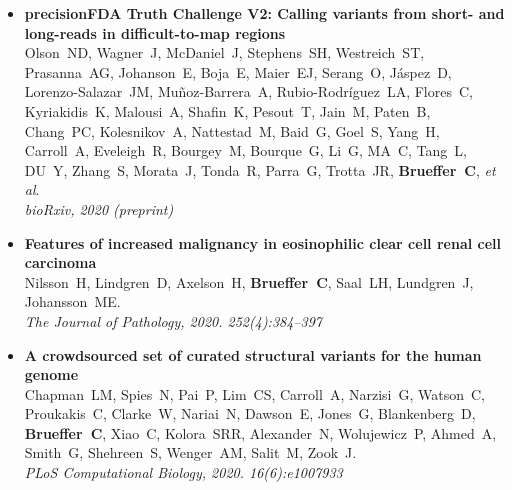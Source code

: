 \documentclass[11pt]{book}
\begin{document}
{\begin{tabularx}{\textwidth}{rX}
\end{tabularx}


}




\vspace{5mm}

\begin{itemize}[labelsep=5.3mm]

  \item \textbf{precisionFDA Truth Challenge V2: Calling variants from short- and long-reads in difficult-to-map regions} \\[1mm]
  Olson~ND, Wagner~J, McDaniel~J, Stephens~SH, Westreich~ST, Prasanna~AG, Johanson~E, Boja~E, Maier~EJ, Serang~O, Jáspez~D, Lorenzo-Salazar~JM, Muñoz-Barrera~A, Rubio-Rodríguez~LA, Flores~C, Kyriakidis~K, Malousi~A, Shafin~K, Pesout~T, Jain~M, Paten~B, Chang~PC, Kolesnikov~A, Nattestad~M, Baid~G, Goel~S, Yang~H, Carroll~A, Eveleigh~R, Bourgey~M, Bourque~G, Li~G, MA~C, Tang~L, DU~Y, Zhang~S, Morata~J, Tonda~R, Parra~G, Trotta~JR, \mbox{\textbf{Brueffer~C}}, \textit{et al}. \\[1mm]
  \textit{bioRxiv, 2020 (preprint)}

  \item \textbf{Features of increased malignancy in eosinophilic clear cell renal cell carcinoma} \\[1mm]
  Nilsson~H, Lindgren~D, Axelson~H, \textbf{Brueffer~C}, Saal~LH, Lundgren~J, Johansson~ME. \\[1mm]
  \textit{The Journal of Pathology, 2020. 252(4):384--397}

  \item \textbf{A crowdsourced set of curated structural variants for the human genome} \\[1mm]
  Chapman~LM, Spies~N, Pai~P, Lim~CS, Carroll~A, Narzisi~G, Watson~C, Proukakis~C, Clarke~W, Nariai~N, Dawson~E, Jones~G, Blankenberg~D, \mbox{\textbf{Brueffer~C}}, Xiao~C, Kolora~SRR, Alexander~N, Wolujewicz~P, Ahmed~A, Smith~G, Shehreen~S, Wenger~AM, Salit~M, Zook~J. \\[1mm]
  \textit{PLoS Computational Biology, 2020. 16(6):e1007933}


\end{itemize}
\end{document}
